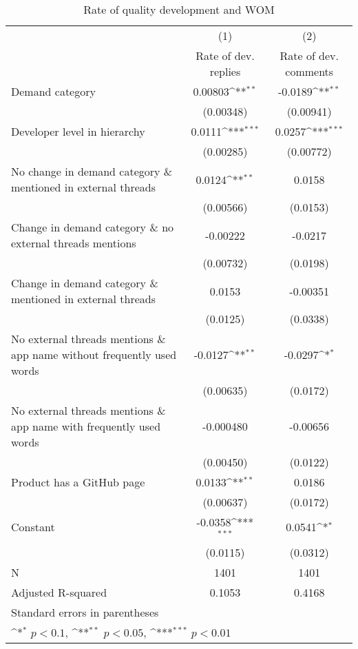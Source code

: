 \documentclass[13pt]{article}
\numberwithin{figure}{section}
\numberwithin{table}{section}
\theoremstyle{indented}
\numberwithin{equation}{section} %
\begin{document}
\begin{table}

\caption{Rate of quality development and WOM}
\label{tab1}
\def\sym#1{\ifmmode^{#1}\else\(^{#1}\)\fi}
\begin{tabular}{l*{2}{c}}
\hline\hline
            &\multicolumn{1}{c}{(1)}&\multicolumn{1}{c}{(2)}\\
            &\multicolumn{1}{c}{Rate of dev. replies}&\multicolumn{1}{c}{Rate of dev. comments}\\
\hline
Demand category&     0.00803\sym{**} &     -0.0189\sym{**} \\
            &   (0.00348)         &   (0.00941)         \\
[1em]
Developer level in hierarchy    &      0.0111\sym{***}&      0.0257\sym{***}\\
            &   (0.00285)         &   (0.00772)         \\
[1em]
No change in demand category \& mentioned in external threads&      0.0124\sym{**} &      0.0158         \\
            &   (0.00566)         &    (0.0153)         \\
[1em]
Change in demand category \& no external threads mentions&    -0.00222         &     -0.0217         \\
            &   (0.00732)         &    (0.0198)         \\
[1em]
Change in demand category \& mentioned in external threads&      0.0153         &    -0.00351         \\
            &    (0.0125)         &    (0.0338)         \\
[1em]
No external threads mentions \& app name without frequently used words&     -0.0127\sym{**} &     -0.0297\sym{*}  \\
            &   (0.00635)         &    (0.0172)         \\
[1em]
No external threads mentions \& app name with frequently used words&   -0.000480         &    -0.00656         \\
            &   (0.00450)         &    (0.0122)         \\
[1em]
Product has a GitHub page       &      0.0133\sym{**} &      0.0186         \\
            &   (0.00637)         &    (0.0172)         \\
[1em]
Constant     &     -0.0358\sym{***}&      0.0541\sym{*}  \\
            &    (0.0115)         &    (0.0312)         \\
\hline
N           &        1401         &        1401         \\
Adjusted R-squared        &          0.1053           &            0.4168         \\
\hline\hline
\multicolumn{3}{l}{\footnotesize Standard errors in parentheses}\\
\multicolumn{3}{l}{\footnotesize \sym{*} \(p<0.1\), \sym{**} \(p<0.05\), \sym{***} \(p<0.01\)}\\
\end{tabular}

\end{table}
\end{document}
